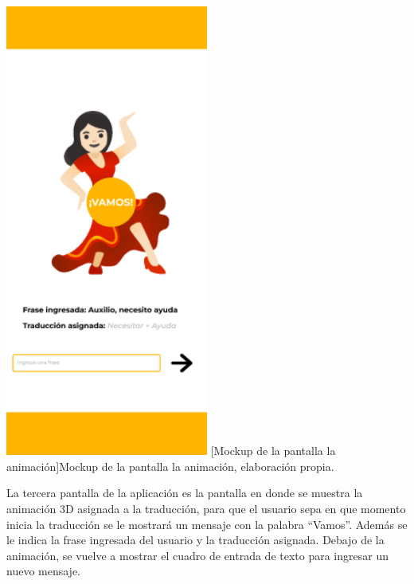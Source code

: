 \begin{center}
    \includegraphics[width=0.5\textwidth]{Images/Cap 3/Pantalla3.png}
    [Mockup de la pantalla la animación]{Mockup de la pantalla la animación, elaboración propia.}
\end{center}

La tercera pantalla de la aplicación es la pantalla en donde se muestra la animación 3D asignada a la traducción, para que el usuario sepa en que momento inicia la traducción se le mostrará un mensaje con la palabra “Vamos”. Además se le indica la frase ingresada del usuario y la traducción asignada. Debajo de la animación, se vuelve a mostrar el cuadro de entrada de texto para ingresar un nuevo mensaje.

